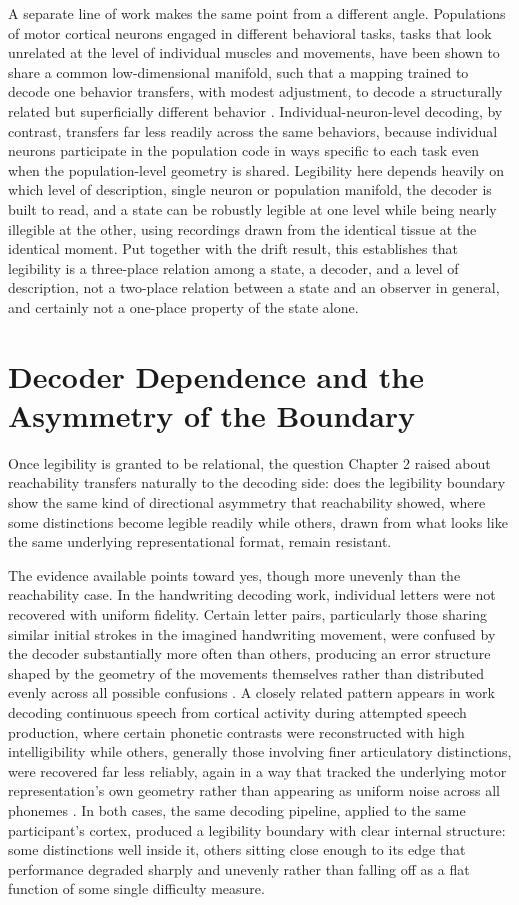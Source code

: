 \documentclass[11pt]{book}
\begin{document}
A separate line of work makes the same point from a different angle. Populations of motor cortical neurons engaged in different behavioral tasks, tasks that look unrelated at the level of individual muscles and movements, have been shown to share a common low-dimensional manifold, such that a mapping trained to decode one behavior transfers, with modest adjustment, to decode a structurally related but superficially different behavior \cite{gallego2018}. Individual-neuron-level decoding, by contrast, transfers far less readily across the same behaviors, because individual neurons participate in the population code in ways specific to each task even when the population-level geometry is shared. Legibility here depends heavily on which level of description, single neuron or population manifold, the decoder is built to read, and a state can be robustly legible at one level while being nearly illegible at the other, using recordings drawn from the identical tissue at the identical moment. Put together with the drift result, this establishes that legibility is a three-place relation among a state, a decoder, and a level of description, not a two-place relation between a state and an observer in general, and certainly not a one-place property of the state alone.

\section{Decoder Dependence and the Asymmetry of the Boundary}

Once legibility is granted to be relational, the question Chapter 2 raised about reachability transfers naturally to the decoding side: does the legibility boundary show the same kind of directional asymmetry that reachability showed, where some distinctions become legible readily while others, drawn from what looks like the same underlying representational format, remain resistant.

The evidence available points toward yes, though more unevenly than the reachability case. In the handwriting decoding work, individual letters were not recovered with uniform fidelity. Certain letter pairs, particularly those sharing similar initial strokes in the imagined handwriting movement, were confused by the decoder substantially more often than others, producing an error structure shaped by the geometry of the movements themselves rather than distributed evenly across all possible confusions \cite{willett2021}. A closely related pattern appears in work decoding continuous speech from cortical activity during attempted speech production, where certain phonetic contrasts were reconstructed with high intelligibility while others, generally those involving finer articulatory distinctions, were recovered far less reliably, again in a way that tracked the underlying motor representation's own geometry rather than appearing as uniform noise across all phonemes \cite{anumanchipalli2019}. In both cases, the same decoding pipeline, applied to the same participant's cortex, produced a legibility boundary with clear internal structure: some distinctions well inside it, others sitting close enough to its edge that performance degraded sharply and unevenly rather than falling off as a flat function of some single difficulty measure.
\end{document}
